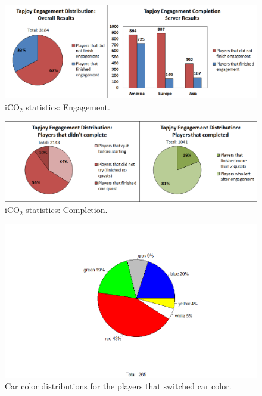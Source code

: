 \documentclass[preprint,authoryear,12pt]{elsarticle}
\begin{document}
\begin{figure}[htb]
	\begin{center}
		\includegraphics[width=.95\linewidth]{ijhcs14-img/engagement}
		\caption{iCO$_2$ statistics: Engagement.\label{fig:engagement}}
	\end{center}
\end{figure}

\begin{figure}[htb]
	\begin{center}
		\includegraphics[width=.95\linewidth]{ijhcs14-img/completion}
		\caption{iCO$_2$ statistics: Completion.\label{fig:completion}}
	\end{center}
\end{figure}



\begin{figure}[htb]
	\begin{center}
		\includegraphics[width=.95\linewidth]{ijhcs14-img/colour_all}
		\caption{Car color distributions for the players that switched car color.\label{fig:4diagrams_color}}
	\end{center}
\end{figure}
\end{document}
